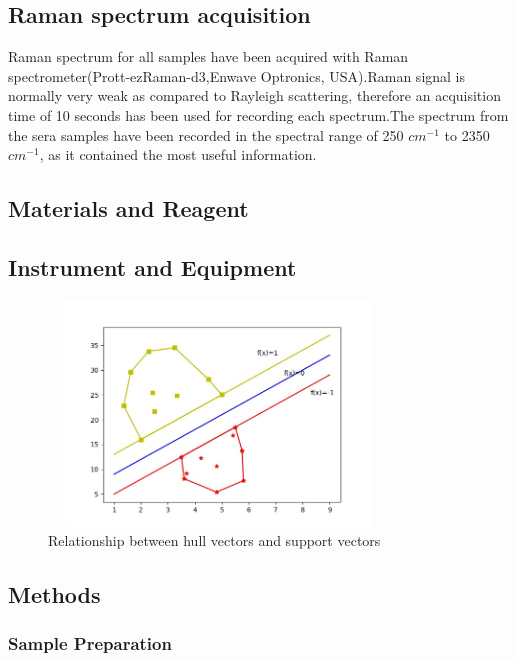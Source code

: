 \documentclass[a4paper]{article}
\begin{document}
\subsection{Raman spectrum acquisition}%
Raman spectrum for all samples have been acquired with Raman spectrometer(Prott-ezRaman-d3,Enwave Optronics, USA).Raman  signal  is  normally  very  weak  as  compared  to  Rayleigh  scattering,  therefore  an acquisition time of 10 seconds has been used for recording each spectrum.The spectrum from the  sera  samples  have  been  recorded  in  the  spectral  range  of  250 $cm^{−1}$  to  2350 $cm^{−1}$,  as  it contained the most useful information.




\subsection{Materials and Reagent}

\subsection{Instrument and Equipment}



\begin{figure}[h]
  \centering
  \includegraphics[width=9cm,height=6cm]{HullVector_SupportVector}
  \caption{Relationship between hull vectors and support vectors}
\end{figure}





\subsection{Methods}
\subsubsection{Sample Preparation}
\end{document}

